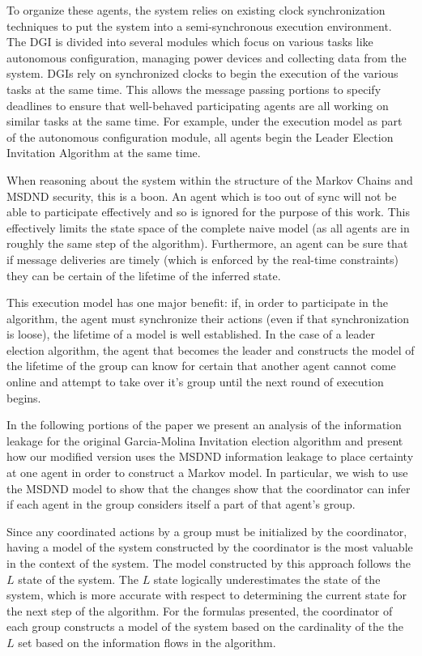 To organize these agents, the system relies on existing clock synchronization techniques to put the system into a semi-synchronous execution environment. The \ac{DGI} is divided into several modules which focus on various tasks like autonomous configuration, managing power devices and collecting data from the system. \ac{DGI}s rely on synchronized clocks to begin the execution of the various tasks at the same time. This allows the message passing portions to specify deadlines to ensure that well-behaved participating agents are all working on similar tasks at the same time. For example, under the execution model as part of the autonomous configuration module, all agents begin the Leader Election Invitation Algorithm at the same time.

When reasoning about the system within the structure of the Markov Chains and MSDND security, this is a boon. An agent which is too out of sync will not be able to participate effectively and so is ignored for the purpose of this work. This effectively limits the state space of the complete naive model (as all agents are in roughly the same step of the algorithm). Furthermore, an agent can be sure that if message deliveries are timely (which is enforced by the real-time constraints) they can be certain of the lifetime of the inferred state.

This execution model has one major benefit: if, in order to participate in the algorithm, the agent must synchronize their actions (even if that synchronization is loose), the lifetime of a model is well established. In the case of a leader election algorithm, the agent that becomes the leader and constructs the model of the lifetime of the group can know for certain that another agent cannot come online and attempt to take over it's group until the next round of execution begins.

In the following portions of the paper we present an analysis of the information leakage for the original Garcia-Molina Invitation election algorithm and present how our modified version uses the MSDND information leakage to place certainty at one agent in order to construct a Markov model. In particular, we wish to use the MSDND model to show that the changes show that the coordinator can infer if each agent in the group considers itself a part of that agent's group.

Since any coordinated actions by a group must be initialized by the coordinator, having a model of the system constructed by the coordinator is the most valuable in the context of the system. The model constructed by this approach follows the $L$ state of the system. The $L$ state logically underestimates the state of the system, which is more accurate with respect to determining the current state for the next step of the algorithm. For the formulas presented, the coordinator of each group constructs a model of the system based on the cardinality of the the $L$ set based on the information flows in the algorithm.

